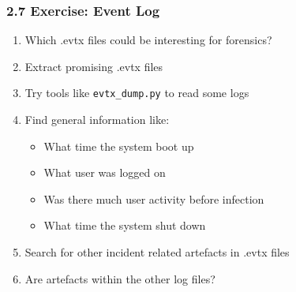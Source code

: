 \begin{frame}[fragile]
  \frametitle{2.7 Exercise: Event Log}
    \begin{enumerate}
        \item Which .evtx files could be interesting for forensics?
        \item Extract promising .evtx files
	\item Try tools like \texttt{evtx\_dump.py} to read some logs
        \item Find general information like:
        \begin{itemize}
            \item What time the system boot up
            \item What user was logged on
            \item Was there much user activity before infection
            \item What time the system shut down
        \end{itemize}
        \item Search for other incident related artefacts in .evtx files
        \item Are artefacts within the other log files?
    \end{enumerate}
\end{frame}





